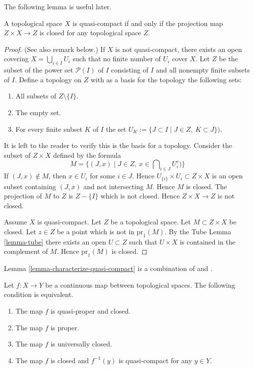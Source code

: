 \noindent
The following lemma is useful later.

\begin{lemma}
\label{lemma-characterize-quasi-compact}
A topological space $X$ is quasi-compact if and only if the
projection map $Z \times X \to Z$ is closed for
any topological space $Z$.
\end{lemma}

\begin{proof}
(See also remark below.)
If $X$ is not quasi-compact, there exists an open covering
$X = \bigcup_{i \in I} U_i$ such that no finite
number of $U_i$ cover $X$.
Let $Z$ be the subset of the power set $\mathcal{P}(I)$ of $I$
consisting of $I$ and all nonempty finite subsets of $I$.
Define a topology on $Z$ with as a basis for the topology
the following sets:
\begin{enumerate}
\item All subsets of $Z\setminus\{I\}$.
\item The empty set.
\item For every finite subset $K$ of $I$ the set
$U_K := \{J\subset I \mid J \in Z, \ K\subset J \})$.
\end{enumerate}
It is left to the reader to verify this is the basis for a topology.
Consider the subset of $Z\times X$ defined by the formula
$$
M = \{(J, x) \mid J \in Z, \ x \in \bigcap\nolimits_{i \in J} U_i^c)\}
$$
If $(J, x) \not \in M$, then $x \in U_i$ for some $i \in J$.
Hence $U_{\{i\}} \times U_i \subset Z \times X$ is an open
subset containing $(J, x)$ and not intersecting $M$. Hence
$M$ is closed. The projection of $M$ to $Z$ is $Z-\{I\}$
which is not closed. Hence $Z \times X \to Z$ is not closed.

\medskip\noindent
Assume $X$ is quasi-compact. Let $Z$ be a topological space.
Let $M \subset  Z \times X$ be closed. Let $z \in Z$ be a point
which is not in $\text{pr}_1(M)$. By the Tube Lemma \ref{lemma-tube}
there exists an open $U \subset Z$ such that $U \times X$ is
contained in the complement of $M$. Hence $\text{pr}_1(M)$ is closed.
\end{proof}

\begin{remark}
\label{remark-lemma-literature}
Lemma \ref{lemma-characterize-quasi-compact} is a combination of
\cite[I, p. 75, Lemme 1]{Bourbaki} and
\cite[I, p. 76, Corrolaire 1]{Bourbaki}.
\end{remark}

\begin{theorem}
\label{theorem-characterize-proper}
Let $f: X\to Y$ be a continuous map between
topological spaces. The following condition is equivalent.
\begin{enumerate}
\item The map $f$ is quasi-proper and closed.
\item The map $f$ is proper.
\item The map $f$ is universally closed.
\item The map $f$ is closed and $f^{-1}(y)$ is quasi-compact for any
$y\in Y$.
\end{enumerate}
\end{theorem}


